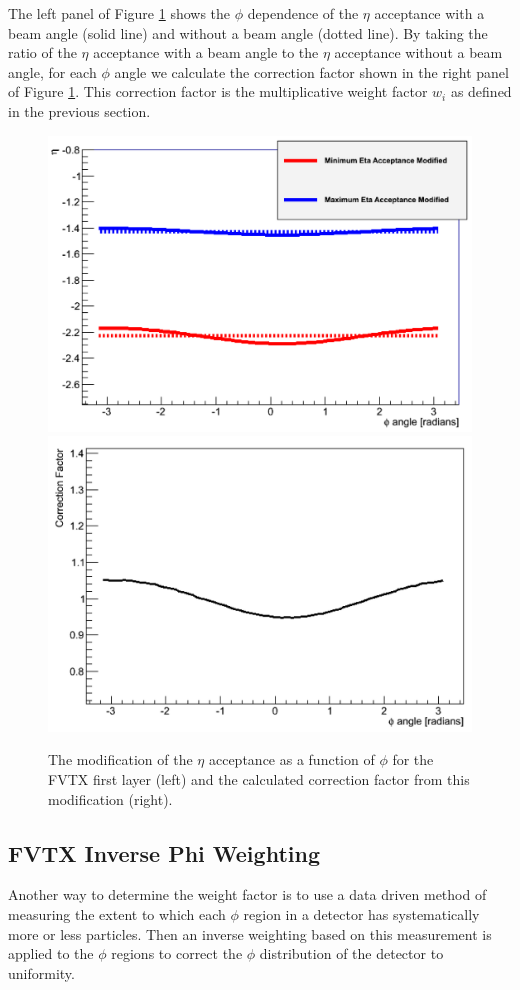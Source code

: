 The left panel of Figure \ref{fig:analytic_corr} shows the $\phi$ dependence of the $\eta$ acceptance with a beam angle (solid line) and without a beam angle (dotted line). By taking the ratio of the $\eta$ acceptance with a beam angle to the $\eta$ acceptance without a beam angle, for each $\phi$ angle we calculate the correction factor shown in the right panel of Figure \ref{fig:analytic_corr}. This correction factor is the multiplicative weight factor $w_i$ as defined in the previous section.
\begin{figure}[!ht]
\centering
\includegraphics[width=0.47\linewidth]{figs/eta_modification.png}
\includegraphics[width=0.47\linewidth]{figs/analytic_correction.png}
\caption{The modification of the $\eta$ acceptance as a function of $\phi$ for the FVTX first layer (left) and the calculated correction factor from this modification (right).}
\label{fig:analytic_corr}
\end{figure}

\subsection{FVTX Inverse Phi Weighting}
\label{sec:FVTX_inv_phi_weight}
Another way to determine the weight factor is to use a data driven method of measuring the extent to which each $\phi$ region in a detector has systematically more or less particles. Then an inverse weighting based on this measurement is applied to the $\phi$ regions to correct the $\phi$ distribution of the detector to uniformity.

